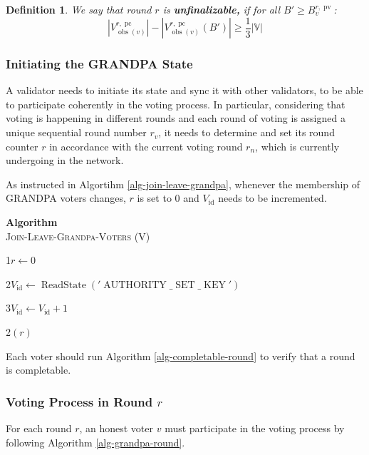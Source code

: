 \documentclass{article}
\newcommand{\tmname}[1]{\textsc{#1}}
\newcommand{\tmop}[1]{\ensuremath{\operatorname{#1}}}
\newcommand{\tmstrong}[1]{\textbf{#1}}
\newcommand{\tmtextbf}[1]{{\bfseries{#1}}}
\newcommand{\tmtextsc}[1]{{\scshape{#1}}}
\newcommand{\tmtexttt}[1]{{\ttfamily{#1}}}
\newcommand{\tmverbatim}[1]{{\ttfamily{#1}}}
\newtheorem{definition}{Definition}
\providecommand{\tmname}[1]{\tmtextsc{#1}}
\providecommand{\tmop}[1]{\ensuremath{\mathrm{#1}}}
\providecommand{\tmstrong}[1]{\tmtextbf{#1}}
\providecommand{\tmtextbf}[1]{\tmtextbf{#1}}
\providecommand{\tmverbatim}[1]{\tmtexttt{#1}}
\newtheorem{definition}{Definition}
\newcommand{\algorithm}[1]{\vspace{0.5cm} \noindent \textbf{Algorithm} \\#1}
\begin{document}
\begin{definition}
  We say that round $r$ is {\tmstrong{unfinalizable,}} if for all $B' \geqslant
  B_v^{r, \tmop{pv}}$:
  \[ | V^{r, \tmop{pc}}_{\tmop{obs} (v)} | - | V^{r, \tmop{pc}}_{\tmop{obs}
     (v)_{}} (B') | \geqslant \frac{1}{3} | \mathbb{V} | \]
\end{definition}

\subsubsection{Initiating the GRANDPA State}

A validator needs to initiate its state and sync it with other validators, to be able to participate coherently in the voting process. In particular,
considering that voting is happening in different rounds and each round of
voting is assigned a unique sequential round number $r_v$, it needs to
determine and set its round counter $r$ in accordance with the current voting
round $r_n$, which is currently undergoing in the network.

As instructed in Algortihm \ref{alg-join-leave-grandpa}, whenever the
membership of GRANDPA voters ch\tmverbatim{}anges, $r$ is set to 0 and
$V_{\tmop{id}}$ needs to be incremented.

{\algorithm{\label{alg-join-leave-grandpa}{\tmname{Join-Leave-Grandpa-Voters}}
(V)

1\quad$r \leftarrow 0$

2\quad$V_{\tmop{id}} \leftarrow \tmop{ReadState} (' \tmop{AUTHORITY} \_
\tmop{SET} \_ \tmop{KEY}')$

3\quad$V_{\tmop{id}} \leftarrow V_{\tmop{id}} + 1$

2\quad{\tmname{Execute-One-Grandpa-Round}}$(r)$}}

Each voter should run Algorithm \ref{alg-completable-round} to verify that a
round is completable.

\subsubsection{Voting Process in Round $r$}

For each round $r$, an honest voter $v$ must participate in the voting process by following Algorithm \ref{alg-grandpa-round}.
\end{document}
